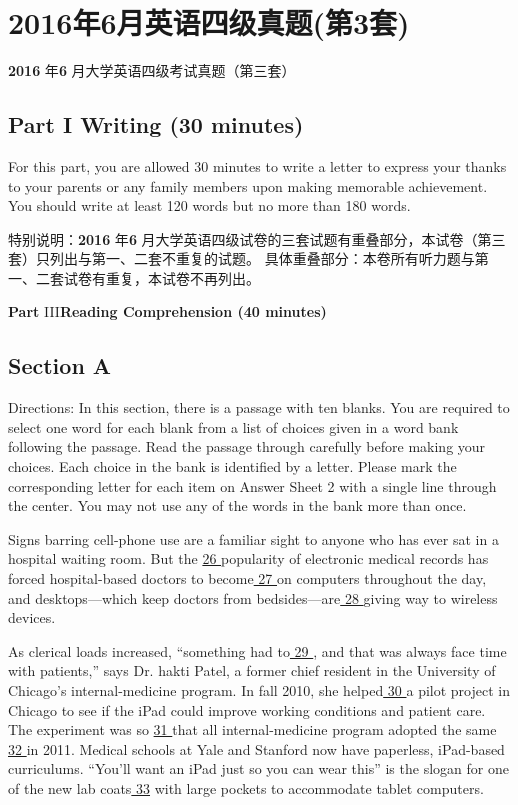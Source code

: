 \documentclass[UTF8,11pt]{ctexart}
\begin{document}
\section*{2016年6月英语四级真题(第3套)}
\textbf{2016} 年\textbf{6} 月大学英语四级考试真题（第三套）


\subsection*{\textbf{Part I Writing (30 minutes)}}


For this part, you are allowed 30 minutes to write a letter to express your thanks to your parents or any family members upon making memorable achievement. You should write at least 120 words but no more than 180 words.


特别说明：\textbf{2016} 年\textbf{6} 月大学英语四级试卷的三套试题有重叠部分，本试卷（第三套）只列出与第一、二套不重复的试题。 具体重叠部分：本卷所有听力题与第一、二套试卷有重复，本试卷不再列出。


\textbf{Part} III\textbf{Reading Comprehension (40 minutes)}


\subsection*{\textbf{Section A}}


Directions: In this section, there is a passage with ten blanks. You are required to select one word for each blank from a list of choices given in a word bank following the passage. Read the passage through carefully before making your choices. Each choice in the bank is identified by a letter. Please mark the corresponding letter for each item on Answer Sheet 2 with a single line through the center. You may not use any of the words in the bank more than once.


Signs barring cell-phone use are a familiar sight to anyone who has ever sat in a hospital waiting room. But the \uline{26 }popularity of electronic medical records has forced hospital-based doctors to become\uline{ 27 }on computers throughout the day, and desktops—which keep doctors from bedsides—are\uline{ 28 }giving way to wireless devices.


As clerical loads increased, “something had to\uline{ 29 }, and that was always face time with patients,” says Dr. hakti Patel, a former chief resident in the University of Chicago’s internal-medicine program. In fall 2010, she helped\uline{ 30 }a pilot project in Chicago to see if the iPad could improve working conditions and patient care. The experiment was so \uline{31 }that all internal-medicine program adopted the same\uline{ 32 }in 2011. Medical schools at Yale and Stanford now have paperless, iPad-based curriculums. “You’ll want an iPad just so you can wear this” is the slogan for one of the new lab coats\uline{ 33} with large pockets to accommodate tablet computers.
\end{document}
